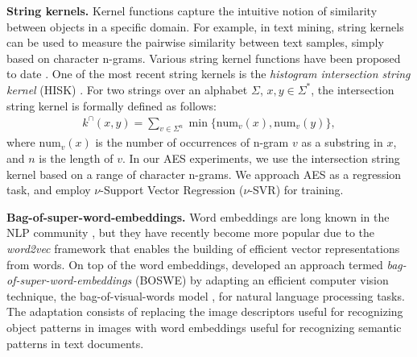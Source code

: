 \documentclass[11pt,a4paper]{article}
\begin{document}
\noindent
{\bf String kernels.}
Kernel functions \cite{taylor-Cristianini-cup-2004} capture the intuitive notion of similarity between objects in a specific domain. For example, in text mining, string kernels can be used to measure the pairwise similarity between text samples, simply based on character n-grams. Various string kernel functions have been proposed to date \cite{LodhiSSCW02,taylor-Cristianini-cup-2004,ionescu-popescu-cahill-EMNLP-2014}. One of the most recent string kernels is the \emph{histogram intersection string kernel} (HISK) \cite{ionescu-popescu-cahill-EMNLP-2014}. For two strings over an alphabet $\Sigma$, $x,y \in \Sigma^*$, the intersection string kernel is formally defined as follows:
\begin{equation}
\begin{split}
k^{\cap}(x,y)=\sum\limits_{v \in \Sigma^n} \min \lbrace \mbox{num}_v(x), \mbox{num}_v(y) \rbrace ,
\end{split}
\end{equation}
where $\mbox{num}_v(x)$ is the number of occurrences of n-gram $v$ as a substring in $x$, and $n$ is the length of $v$. In our AES experiments, we use the intersection string kernel based on a range of character n-grams. We approach AES as a regression task, and employ $\nu$-Support Vector Regression ($\nu$-SVR) \cite{Suykens-NPL-1999,taylor-Cristianini-cup-2004} for training.

\noindent
{\bf Bag-of-super-word-embeddings.}
Word embeddings are long known in the NLP community \cite{Bengio-JMLR-2003,Collobert-ICML-2008}, but they have recently become more popular due to the \emph{word2vec} \cite{Mikolov-NIPS-2013} framework that enables the building of efficient vector representations from words. On top of the word embeddings,  developed an approach termed \emph{bag-of-super-word-embeddings} (BOSWE) by adapting an efficient computer vision technique, the bag-of-visual-words model \cite{Csurka-2004}, for natural language processing tasks. The adaptation consists of replacing the image descriptors \cite{Lowe-SIFT-2004} useful for recognizing object patterns in images with word embeddings \cite{Mikolov-NIPS-2013} useful for recognizing semantic patterns in text documents. 
\end{document}
